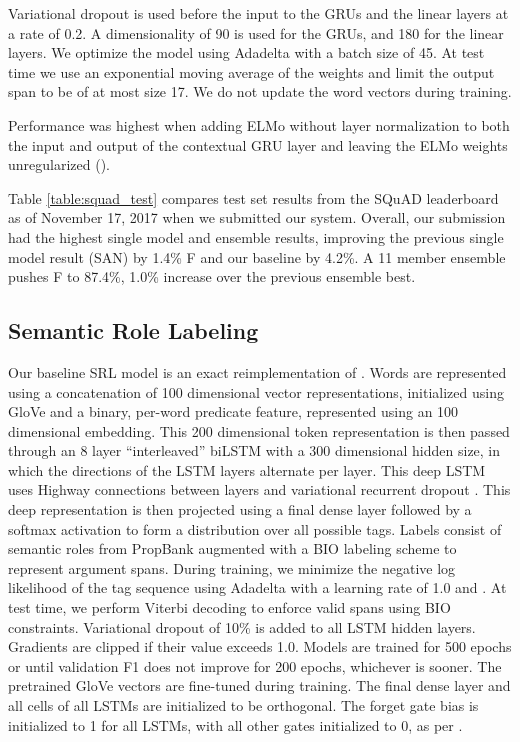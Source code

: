 \documentclass[11pt,a4paper]{article}
\newcommand{\ELMO}{ELMo}
\begin{document}
Variational dropout is used before the input to the GRUs and the linear layers at a rate of 0.2. 
A dimensionality of 90 is used for the GRUs, and 180 for the linear layers. We optimize the model using Adadelta with a batch size of 45. At test time we use an exponential moving average of the weights and limit the output span to be of at most size 17. We do not update the word vectors during training.

Performance was highest when adding \ELMO{} without layer normalization to both the input and output of the contextual GRU layer and leaving the \ELMO{} weights unregularized ().

Table \ref{table:squad_test} compares test set results from the SQuAD leaderboard as of November 17, 2017 when we submitted our system.
Overall, our submission had the highest single model and ensemble results, improving the previous single model result (SAN) by 1.4\% F and our baseline by 4.2\%.  A 11 member ensemble pushes F to 87.4\%, 1.0\% increase over the previous ensemble best.




\subsection{Semantic Role Labeling}
Our baseline SRL model is an exact reimplementation of \citep{He2017DeepSR}. Words are represented using a concatenation of 100 dimensional vector representations, initialized using GloVe \citep{Pennington2014GloveGV} and a binary, per-word predicate feature, represented using an 100 dimensional embedding. This 200 dimensional token representation is then passed through an 8 layer ``interleaved'' biLSTM with a 300 dimensional hidden size, in which the directions of the LSTM layers alternate per layer. This deep LSTM uses Highway connections \citep{Srivastava2015TrainingVD} between layers and variational recurrent dropout \citep{Gal2016ATG}. This deep representation is then projected using a final dense layer followed by a softmax activation to form a distribution over all possible tags. Labels consist of semantic roles from PropBank \citep{Palmer2005propbank} augmented with a BIO labeling scheme to represent argument spans. During training, we minimize the negative log likelihood of the tag sequence using Adadelta with a learning rate of 1.0 and  \citep{Zeiler2012ADADELTAAA}. At test time, we perform Viterbi decoding to enforce valid spans using BIO constraints. Variational dropout of 10\% is added to all LSTM hidden layers. Gradients are clipped if their value exceeds 1.0. Models are trained for 500 epochs or until validation F1 does not improve for 200 epochs, whichever is sooner. The pretrained GloVe vectors are fine-tuned during training. The final dense layer and all cells of all LSTMs are initialized to be orthogonal. The forget gate bias is initialized to 1 for all LSTMs, with all other gates initialized to 0, as per \citep{Jzefowicz2015AnEE}.
\end{document}
